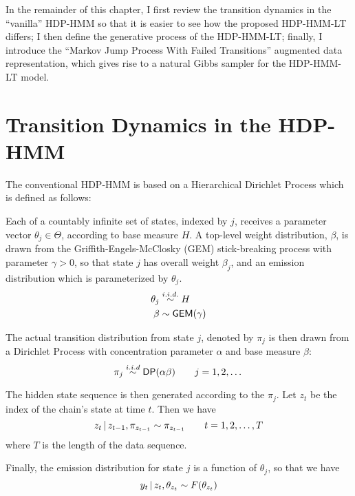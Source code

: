 In the remainder of this chapter, I first review the transition
dynamics in the ``vanilla'' HDP-HMM so that it is easier to see how
the proposed HDP-HMM-LT differs; I then define the generative process
of the HDP-HMM-LT; finally, I introduce the ``Markov Jump Process With
Failed Transitions'' augmented data representation, which gives rise
to a natural Gibbs sampler for the HDP-HMM-LT model.

\section{Transition Dynamics in the HDP-HMM}
\label{sec:transition-dynamics}

The conventional HDP-HMM \citep{teh2006hierarchical} is based on a
Hierarchical Dirichlet Process which is defined as follows:

Each of a countably infinite set of states, indexed by $j$, receives a
parameter vector $\theta_j \in \Theta$, according to base measure $H$.
A top-level weight distribution, $\beta$, is drawn from the
Griffith-Engels-McClosky (GEM) stick-breaking process with 
parameter $\gamma > 0$, so that state $j$
has overall weight $\beta_j$, and an emission distribution which is
parameterized by $\theta_j$.
\begin{align} \theta_j &\stackrel{i.i.d.}{\sim} H \\ \beta &\sim
\mathsf{GEM}(\gamma)
\end{align}

The actual transition distribution from state $j$, denoted by $\pi_j$
is then drawn from a Dirichlet Process with concentration parameter
$\alpha$ and base measure $\beta$:
\begin{equation}
  \label{eq:1} \pi_j \stackrel{i.i.d}{\sim} \mathsf{DP}(\alpha \beta) \qquad j
= 1, 2, \dots
\end{equation}

The hidden state sequence is then generated according to the $\pi_j$.
Let $z_t$ be the index of the chain's state at time $t$.  Then we have
\begin{equation}
  \label{eq:4} z_t \, \vert \, z_{t-1}, \pi_{z_{t-1}} \sim \pi_{z_{t-1}}
\qquad t = 1, 2, \dots, T
\end{equation} where $T$ is the length of the data sequence.

Finally, the emission distribution for state $j$ is a function of
$\theta_j$, so that we have
\begin{equation}
  \label{eq:5} y_t \, \vert \, z_{t}, \theta_{z_t} \sim F(\theta_{z_t})
\end{equation}

